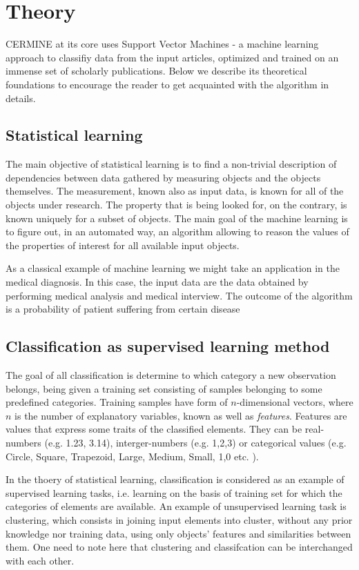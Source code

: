 \chapter{Theory}
CERMINE at its core uses Support Vector Machines - a machine learning approach to classifiy data from the input articles, optimized and trained on an immense set of scholarly publications. Below we describe its theoretical foundations to encourage the reader to get acquainted with the algorithm in details.
\section{Statistical learning}
The main objective of statistical learning is to find a non-trivial description of dependencies between data gathered by measuring objects and the objects themselves. The measurement, known also as input data, is known for all of the objects under research. The property that is being looked for, on the contrary, is known uniquely for a subset of objects. The main goal of the machine learning is to figure out, in an automated way, an algorithm allowing to reason the values of the properties of interest for all available input objects.

As a classical example of machine learning we might take an application in the medical diagnosis. In this case, the input data are the data obtained by performing medical analysis and medical interview. The outcome of the algorithm is a probability of patient suffering from certain disease
\section{Classification as supervised learning method}
The goal of all classification is determine to which category a new observation belongs, being given a training set consisting of samples belonging to some predefined categories. Training samples have form of $n$-dimensional vectors, where $n$ is the number of explanatory variables, known as well as \textit{features}. Features are values that express some traits of the classified elements. They can be real-numbers (e.g. 1.23, 3.14), interger-numbers (e.g. 1,2,3) or categorical values (e.g. {Circle, Square, Trapezoid}, {Large, Medium, Small}, {1,0} etc. ).

In the thoery of statistical learning, classification is considered as an example of supervised learning tasks, i.e. learning on the basis of training set for which the categories of elements are available. An example of unsupervised learning task is clustering, which consists in joining input elements into cluster, without any prior knowledge nor training data, using only objects' features and similarities between them. One need to note here that clustering and classifcation can be interchanged with each other.

